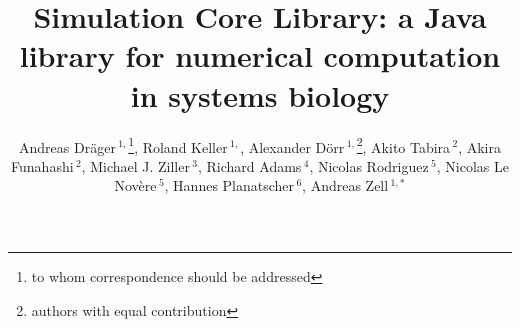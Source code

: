 \documentclass{bioinfo}
\begin{document}

\title[Simulation Core Library]{Simulation Core Library: a Java
library for numerical computation in systems biology}
\author[Dr\"ager \emph{et~al.}]{%
Andreas Dr\"ager\,$^{1,}$\footnote{to whom correspondence should be
addressed}\hspace{.3em},
Roland Keller\,$^{1,}$\dag,
Alexander D\"orr\,$^{1,}$\footnote{authors with equal
contribution}\hspace{.3em},
Akito Tabira\,$^{2}$,
Akira Funahashi\,$^{2}$,
Michael J. Ziller\,$^{3}$,
Richard Adams\,$^{4}$,
Nicolas Rodriguez\,$^{5}$,
Nicolas Le Nov\`{e}re\,$^{5}$,
Hannes Planatscher\,$^{6}$,
Andreas Zell\,$^{1,*}$}
\address{$^{1}$Center for Bioinformatics Tuebingen (ZBIT), University of
Tuebingen, T\"ubingen, Germany,
$^{2}$Keio University, Graduate School of
Science and Technology, Yokohama, Japan, 
$^{3}$Department of Stem Cell and Regenerative Biology, Harvard University,
Cambridge, MA, USA,
$^{4}$SynthSys Edinburgh, CH Waddington Building, University of Edinburgh,
Edinburgh EH9 3JD, UK,
$^{5}$European Bioinformatics Institute, Wellcome Trust Genome Campus, Hinxton,
Cambridge, UK,
$^{6}$Natural and Medical Sciences Institute at the University of Tuebingen,
Reutlingen, Germany}



\maketitle
\end{document}
